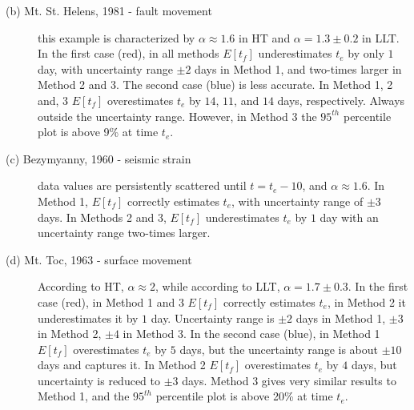 \documentclass{article}
\begin{document}
\begin{description}
  \item[(b) Mt. St. Helens, 1981 - fault movement] this example is characterized by $\alpha \approx 1.6$ in HT and $\alpha = 1.3\pm 0.2$ in LLT. In the first case (red), in all methods $E[t_f]$ underestimates $t_e$ by only $1$ day, with uncertainty range $\pm 2$ days in Method 1, and two-times larger in Method 2 and 3. The second case (blue) is less accurate. In Method 1, 2 and, 3 $E[t_f]$ overestimates $t_e$ by $14$, $11$, and $14$ days, respectively. Always outside the uncertainty range. However, in Method 3 the $95^{th}$ percentile plot is above 9\% at time $t_e$.
  \item[(c) Bezymyanny, 1960 - seismic strain] data values are persistently scattered until $t = t_e - 10$, and $\alpha \approx 1.6$. In Method 1, $E[t_f]$ correctly estimates $t_e$, with uncertainty range of $\pm 3$ days. In Methods 2 and 3, $E[t_f]$ underestimates $t_e$ by $1$ day with an uncertainty range two-times larger.
  \item[(d) Mt. Toc, 1963 - surface movement] According to HT, $\alpha \approx 2$, while according to LLT, $\alpha= 1.7\pm0.3$. In the first case (red), in Method 1 and 3 $E[t_f]$ correctly estimates $t_e$, in Method 2 it underestimates it by $1$ day. Uncertainty range is $\pm 2$ days in Method 1, $\pm 3$ in Method 2, $\pm 4$ in Method 3. In the second case (blue), in Method 1 $E[t_f]$ overestimates $t_e$ by $5$ days, but the uncertainty range is about $\pm 10$ days and captures it. In Method 2 $E[t_f]$ overestimates $t_e$ by $4$ days, but uncertainty is reduced to $\pm 3$ days. Method 3 gives very similar results to Method 1, and the $95^{th}$ percentile plot is above 20\% at time $t_e$.
\end{description}
\end{document}
